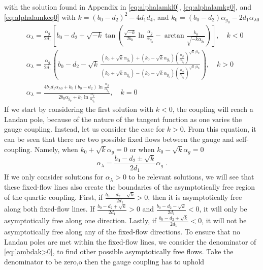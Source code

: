 with the solution found in Appendix in \eqref{eq:alphalamkl0}, \eqref{eq:alphalamkg0}, and \eqref{eq:alphalamkeq0} with $k = (b_0 - d_2)^2 - 4d_1 d_4$, and $k_0 = (b_0 - d_2)\alpha_{g_0} - 2d_1\alpha_{\lambda0}$
\begin{align}
    &\alpha_{\lambda} = \frac{\alpha_{g}}{2d_{1}} \left[ b_0 - d_2 + \sqrt{-k} \tan\left( \frac{\sqrt{-k}}{2b_0} \ln\frac{\alpha_g}{\alpha_{g_0}} - \arctan\frac{k_0}{\sqrt{-k\alpha_{g_0}}} \right) \right] , \quad k<0 \\&
    \alpha_{\lambda} = \frac{\alpha_g}{2d_1} \left( b_0 - d_2 - \sqrt{k} \, \frac{ (k_0 + \sqrt{k}\alpha_{g_0}) + (k_0 - \sqrt{k}\alpha_{g_0}) \left( \frac{\alpha_g}{\alpha_{g_0}} \right)^{\sqrt{k}/b_0} }{ (k_0 + \sqrt{k}\alpha_{g_0}) - (k_0 - \sqrt{k}\alpha_{g_0}) \left( \frac{\alpha_g}{\alpha_{g_0}} \right)^{\sqrt{k}/b_0} } \right) , \quad k>0 \label{eq:lambdak>0}\\&
    \alpha_{\lambda} = \frac{ 4b_0 d_1 \alpha_{\lambda0} + k_0 (b_0 - d_2) \ln\frac{\alpha_g}{\alpha_{g_0}} }{ 2b_0 \alpha_{g_0} + k_0 \ln\frac{\alpha_g}{\alpha_{g_0}} } , \quad k=0 \label{eq:lambdak0}
\end{align}
If we start by considering the first solution with $k<0$, the coupling will reach a Landau pole, because of the nature of the tangent function as one varies the gauge coupling. Instead, let us consider the case for $k>0$. From this equation, it can be seen that there are two possible fixed flows between the gauge and self-coupling. Namely, when $k_0+\sqrt{k}\alpha_g=0$ or when $k_0-\sqrt{k}\alpha_g=0$
\begin{equation}
    \alpha_\lambda =\frac{b_0-d_2\pm\sqrt{k}}{2d_1}\alpha_g\;.\label{eq:lamgfixed}
\end{equation}
If we only consider solutions for $\alpha_\lambda>0$ to be relevant solutions, we will see that these fixed-flow lines also create the boundaries of the asymptotically free region of the quartic coupling. First, if $\frac{b_0-d_2-\sqrt{k}}{2d_1}>0$, then it is asymptotically free along both fixed-flow lines. If $\frac{b_0-d_2+\sqrt{k}}{2d_1}>0$ and $\frac{b_0-d_2-\sqrt{k}}{2d_1}<0$, it will only be asymptotically free along one direction. Lastly, if $\frac{b_0-d_2+\sqrt{k}}{2d_1}<0$, it will not be asymptotically free along any of the fixed-flow directions. To ensure that no Landau poles are met within the fixed-flow lines, we consider the denominator of \eqref{eq:lambdak>0}, to find other possible asymptotically free flows. Take the denominator to be zero,o then the gauge coupling has to uphold
